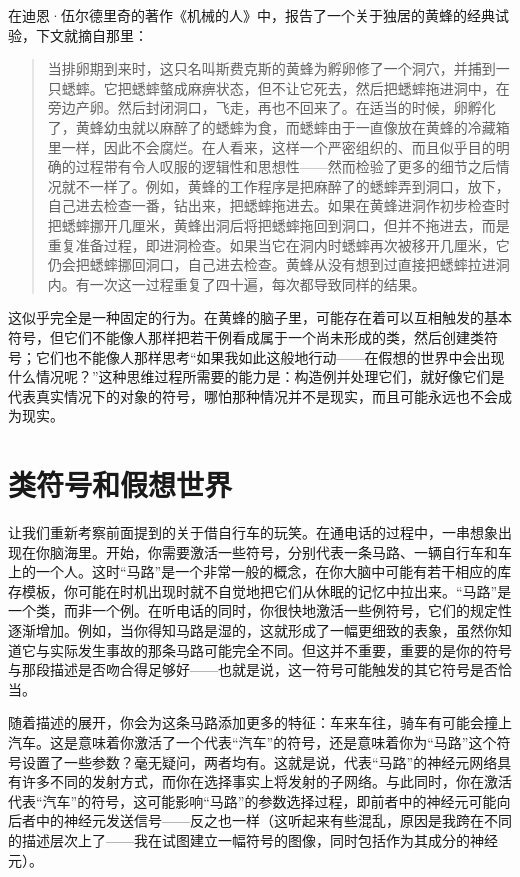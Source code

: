 在迪恩·伍尔德里奇的著作《机械的人》中，报告了一个关于独居的黄蜂的经典试验，下文就摘自那里：

\begin{quote}
当排卵期到来时，这只名叫斯费克斯的黄蜂为孵卵修了一个洞穴，并捕到一只蟋蟀。它把蟋蟀螫成麻痹状态，但不让它死去，然后把蟋蟀拖进洞中，在旁边产卵。然后封闭洞口，飞走，再也不回来了。在适当的时候，卵孵化了，黄蜂幼虫就以麻醉了的蟋蟀为食，而蟋蟀由于一直像放在黄蜂的冷藏箱里一样，因此不会腐烂。在人看来，这样一个严密组织的、而且似乎目的明确的过程带有令人叹服的逻辑性和思想性——然而检验了更多的细节之后情况就不一样了。例如，黄蜂的工作程序是把麻醉了的蟋蟀弄到洞口，放下，自己进去检查一番，钻出来，把蟋蟀拖进去。如果在黄蜂进洞作初步检查时把蟋蟀挪开几厘米，黄蜂出洞后将把蟋蟀拖回到洞口，但并不拖进去，而是重复准备过程，即进洞检查。如果当它在洞内时蟋蟀再次被移开几厘米，它仍会把蟋蟀挪回洞口，自己进去检查。黄蜂从没有想到过直接把蟋蟀拉进洞内。有一次这一过程重复了四十遍，每次都导致同样的结果。
\end{quote}

这似乎完全是一种固定的行为。在黄蜂的脑子里，可能存在着可以互相触发的基本符号，但它们不能像人那样把若干例看成属于一个尚未形成的类，然后创建类符号；它们也不能像人那样思考“如果我如此这般地行动——在假想的世界中会出现什么情况呢？”这种思维过程所需要的能力是：构造例并处理它们，就好像它们是代表真实情况下的对象的符号，哪怕那种情况并不是现实，而且可能永远也不会成为现实。

\section{类符号和假想世界}

让我们重新考察前面提到的关于借自行车的玩笑。在通电话的过程中，一串想象出现在你脑海里。开始，你需要激活一些符号，分别代表一条马路、一辆自行车和车上的一个人。这时“马路”是一个非常一般的概念，在你大脑中可能有若干相应的库存模板，你可能在时机出现时就不自觉地把它们从休眠的记忆中拉出来。“马路”是一个类，而非一个例。在听电话的同时，你很快地激活一些例符号，它们的规定性逐渐增加。例如，当你得知马路是湿的，这就形成了一幅更细致的表象，虽然你知道它与实际发生事故的那条马路可能完全不同。但这并不重要，重要的是你的符号与那段描述是否吻合得足够好——也就是说，这一符号可能触发的其它符号是否恰当。

随着描述的展开，你会为这条马路添加更多的特征：车来车往，骑车有可能会撞上汽车。这是意味着你激活了一个代表“汽车”的符号，还是意味着你为“马路”这个符号设置了一些参数？毫无疑问，两者均有。这就是说，代表“马路”的神经元网络具有许多不同的发射方式，而你在选择事实上将发射的子网络。与此同时，你在激活代表“汽车”的符号，这可能影响“马路”的参数选择过程，即前者中的神经元可能向后者中的神经元发送信号——反之也一样（这听起来有些混乱，原因是我跨在不同的描述层次上了——我在试图建立一幅符号的图像，同时包括作为其成分的神经元）。

